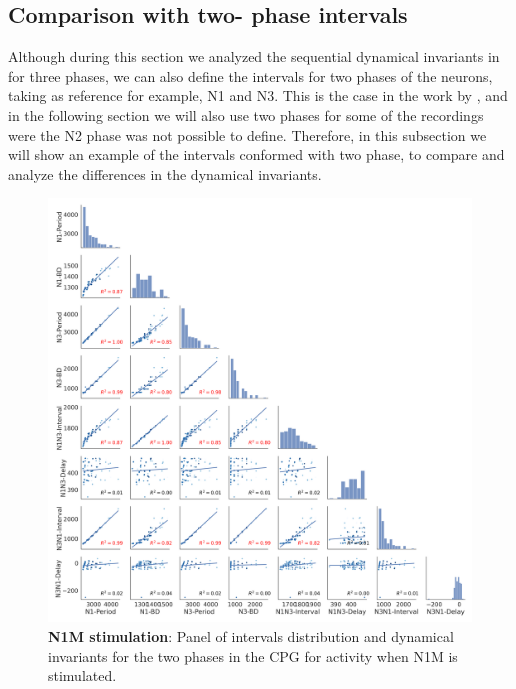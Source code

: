 \subsection{Comparison with two- phase intervals}
Although during this section we analyzed the sequential dynamical invariants in for three phases, we can also define the intervals for two phases of the neurons, taking as reference for example, N1 and N3. This is the case in the work by \cite{elices_robust_2019}, and in the following section we will also use two phases for some of the recordings were the N2 phase was not possible to define. Therefore, in this subsection we will show an example of the intervals conformed with two phase, to compare and analyze the differences in the dynamical invariants. 


\begin{figure}[htbp]
	\centering
	\includegraphics[width=\textwidth]{./invariants/data/MODEL/n1m_driven/images/2phases/_output_pairplot.png}
	\caption{\textbf{N1M stimulation}: Panel of intervals distribution and dynamical invariants for the two phases in the CPG for activity when N1M is stimulated.}
	\label{fig:model n1m stimulation pairplot 2phases}
\end{figure}



